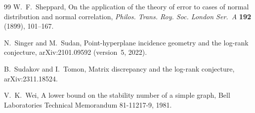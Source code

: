 \begin{thebibliography}{99}
W.~F.~Sheppard, On the application of the theory of error to cases of normal distribution and normal correlation,
\emph{Philos. Trans. Roy. Soc. London Ser.~A} \textbf{192} (1899), 101--167.

N.~Singer and M.~Sudan, Point-hyperplane incidence geometry and the log-rank conjecture, arXiv:2101.09592 (version~5,
2022).

B.~Sudakov and I.~Tomon, Matrix discrepancy and the log-rank conjecture, arXiv:2311.18524.

V.~K.~Wei, A lower bound on the stability number of a simple graph, Bell Laboratories Technical Memorandum
81-11217-9, 1981.

\end{thebibliography}
